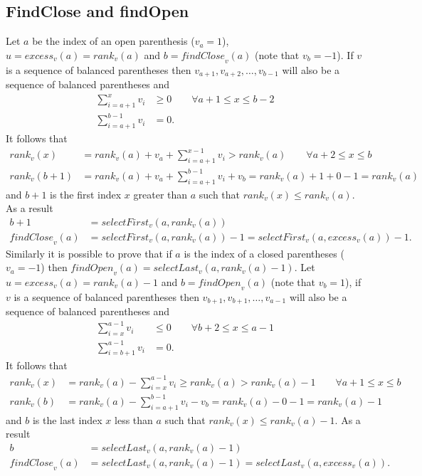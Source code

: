 \documentclass{article}
\begin{document}
\subsection{FindClose and findOpen}
Let $a$ be the index of an open parenthesis ($v_a = 1$), $u = \mathit{excess}_v(a) = \mathit{rank}_v(a)$ and $b = \mathit{findClose}_v(a)$ (note that $v_b=-1$). If $v$ is a sequence of balanced parentheses then $v_{a+1},v_{a+2},\dots,v_{b-1}$ will also be a sequence of balanced parentheses and
    \begin{align*}
        \sum_{i=a+1}^{x} v_i &\geq 0 \qquad \forall a+1 \leq x \leq b-2 \\
        \sum_{i=a+1}^{b-1} v_i &= 0.
    \end{align*}
It follows that
    \begin{align*}
        \mathit{rank}_v(x) &= \mathit{rank}_v(a)+v_a+\sum_{i=a+1}^{x-1} v_i > \mathit{rank}_v(a) \qquad \forall a+2 \leq x \leq b \\
        \mathit{rank}_v(b+1) &= \mathit{rank}_v(a)+v_a+\sum_{i=a+1}^{b-1} v_i+v_b = \mathit{rank}_v(a) + 1 + 0 - 1 = \mathit{rank}_v(a)
    \end{align*}
and $b+1$ is the first index $x$ greater than $a$ such that $\mathit{rank}_v(x) \leq \mathit{rank}_v(a)$. As a result
    \begin{align*}
        b+1 &= selectFirst_v(a,\mathit{rank}_v(a)) \\
        \mathit{findClose}_v(a) &= \mathit{selectFirst}_v(a,\mathit{rank}_v(a)) - 1=\mathit{selectFirst}_v(a,\mathit{excess}_v(a)) - 1.
    \end{align*}
Similarly it is possible to prove that if $a$ is the index of a closed parentheses ($v_a = -1$) then $\mathit{findOpen}_v(a)=\mathit{selectLast}_v(a,\mathit{rank}_v(a)-1)$. Let $u = \mathit{excess}_v(a) = \mathit{rank}_v(a) - 1$ and $b = \mathit{findOpen}_v(a)$ (note that $v_b=1$), if $v$ is a sequence of balanced parentheses then $v_{b+1},v_{b+1},\dots,v_{a-1}$ will also be a sequence of balanced parentheses and
     \begin{align*}
        \sum_{i=x}^{a-1} v_i &\leq 0 \qquad \forall b+2 \leq x \leq a-1 \\
        \sum_{i=b+1}^{a-1} v_i &= 0.
    \end{align*}
It follows that
    \begin{align*}
        \mathit{rank}_v(x) &= \mathit{rank}_v(a)-\sum_{i=x}^{a-1} v_i \geq \mathit{rank}_v(a) > \mathit{rank}_v(a)-1 \qquad \forall a+1 \leq x \leq b \\
        \mathit{rank}_v(b) &= \mathit{rank}_v(a)-\sum_{i=a+1}^{b-1}v_i-v_b = \mathit{rank}_v(a) - 0 - 1 = \mathit{rank}_v(a) - 1
    \end{align*}
and $b$ is the last index $x$ less than $a$ such that $\mathit{rank}_v(x) \leq \mathit{rank}_v(a) - 1$. As a result
    \begin{align*}
        b &= selectLast_v(a,\mathit{rank}_v(a)-1) \\
        \mathit{findClose}_v(a) &= \mathit{selectLast}_v(a,\mathit{rank}_v(a)-1)=\mathit{selectLast}_v(a,\mathit{excess}_v(a)).
    \end{align*}
    
\end{document}
